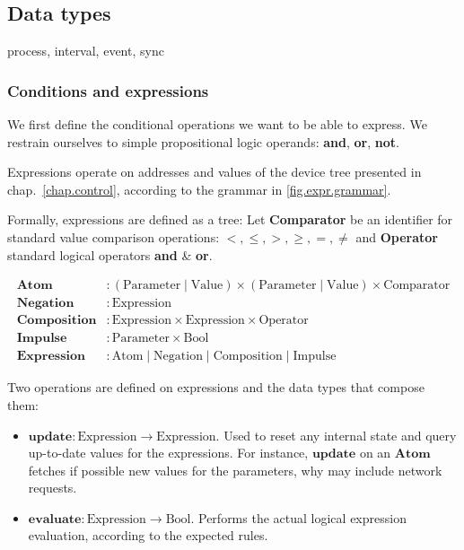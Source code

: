 \documentclass[a4paper]{article}
\begin{document}
\subsection{Data types}
process, interval, event, sync



\subsubsection{Conditions and expressions}

We first define the conditional operations we want to be able to express.
We restrain ourselves to simple propositional logic operands: \textbf{and}, \textbf{or}, \textbf{not}.

Expressions operate on addresses and values of the device tree presented in chap.~\ref{chap.control}, according to the grammar in \ref{fig.expr.grammar}.

Formally, expressions are defined as a tree:
Let \textbf{Comparator} be an identifier for standard value comparison operations: $<, \leq, >, \geq, =, \neq$ and \textbf{Operator} standard logical operators \textbf{and} \&  \textbf{or}.

\begin{align*}
    \mathbf{Atom} & :  (\mathrm{Parameter} \mid \mathrm{Value}) \times (\mathrm{Parameter} \mid \mathrm{Value}) \times \mathrm{Comparator} \\
    \mathbf{Negation} & : \mathrm{Expression} \\
    \mathbf{Composition} & : \mathrm{Expression} \times \mathrm{Expression} \times \mathrm{Operator} \\
    \mathbf{Impulse} & : \mathrm{Parameter} \times \mathrm{Bool} \\
    \mathbf{Expression} &: \mathrm{Atom} \mid \mathrm{Negation} \mid \mathrm{Composition} \mid \mathrm{Impulse}
\end{align*}

Two operations are defined on expressions and the data types that compose them: 

\begin{itemize}
    \item $\mathbf{update}: \mathrm{Expression} \rightarrow \mathrm{Expression}$. Used to reset any internal state and query up-to-date values for the expressions. For instance, $\mathbf{update}$ on an $\mathbf{Atom}$ fetches if possible new values for the parameters, why may include network requests.
    \item $\mathbf{evaluate}: \mathrm{Expression} \rightarrow \mathrm{Bool}$. Performs the actual logical expression evaluation, according to the expected rules. %
\end{itemize}
\end{document}
